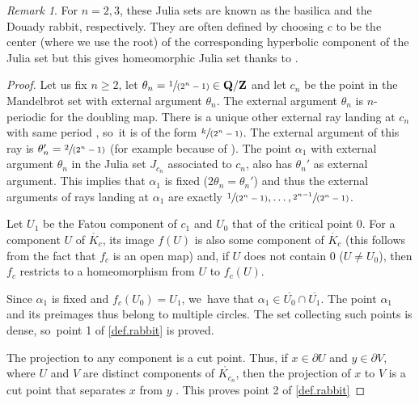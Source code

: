 \documentclass[JEP,XML,SOM,Unicode,NoFloatCountersInSection,published]{cedram}
\newcommand{\spfrac}[2]{\sfrac{#1}{(#2)}}
\theoremstyle{plain}
\theoremstyle{definition}
\theoremstyle{remark}
\newtheorem{remark}[theorem]{Remark}
\begin{document}
\begin{remark}
\label{rmk.basilica.rabbit}
For $n=2,3$, these Julia sets are known as the basilica and the Douady rabbit, respectively.
They are often defined by choosing $c$ to be the center (where we use the root) of the corresponding hyperbolic component of the Julia set but this gives homeomorphic Julia set thanks to \cite[Exp.\,XVIII, Prop.\,1]{douady-hubbard-II}.
\end{remark}

\begin{proof}
Let us fix $n\geq2$, let $\theta_n=\spfrac{1}{2^n-1}\in\mathbf{Q}/\mathbf{Z}$ and let $c_{n}$ be the point in the Mandelbrot set with external argument $\theta_n$. The external argument $\theta_n$ is $n$-periodic for the doubling map.
There is a unique other external ray landing at $c_{n}$ with same period \cite[Prop.\,2]{Douady}, so~it is of the form $\spfrac{k}{2^n-1}$.
The external argument of this ray is $\theta_n'=\spfrac{2}{2^n-1}$ (for example because of \cite{Douady-86}).
The point $\alpha_1$ with external argument $\theta_n$ in the Julia set $J_{c_{n}}$ associated to $c_{n}$, also has $\theta_n'$ as external argument.
This implies that $\alpha_1$ is fixed ($2\theta_n=\theta_{n}'$) and thus the external arguments of rays landing at $\alpha_1$ are exactly $\spfrac{1}{2^n-1},\dots,\spfrac{2^{n-1}}{2^n-1}$.

Let $U_1$ be the Fatou component of $c_1$ and $U_0$ that of the critical point $0$.
For a component $U$ of $\mathring{K_c}$, its image $f(U)$ is also some component of $\mathring{K_c}$ (this follows from the fact that $f_c$ is an open map) and, if $U$ does not contain $0$ (\ie $U\neq U_0$), then $f_c$ restricts to a homeomorphism from $U$ to $f_c(U)$.

Since $\alpha_1$ is fixed and $f_c(U_0)=U_1$, we~have that $\alpha_1\in \overline{U_0} \cap \overline{U_1}$.
The point $\alpha_1$ and its preimages thus belong to multiple circles.
The set collecting such points is dense, so~point 1 of \cref{def.rabbit} is proved.

The projection to any component is a cut point.
Thus, if $x\in\partial U$ and $y\in\partial V$, where $U$ and $V$ are distinct components of $\mathring{K_{c_n}}$, then the projection of $x$ to $V$ is a cut point that separates $x$ from $y$ \cite[Exp.\,I, Prop.\,4]{douady-hubbard-I}.
This proves point 2 of \cref{def.rabbit}


\end{proof}
\end{document}
